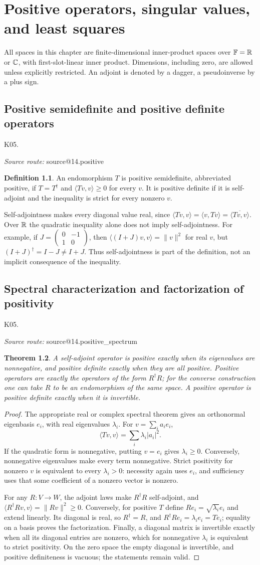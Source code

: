 \documentclass[11pt,a4paper]{book}
\makeatletter
\newtheorem{theorem}{Theorem}[chapter]
\theoremstyle{definition}\newtheorem{definition}[theorem]{Definition}
\theoremstyle{remark}\newtheorem{remark}[theorem]{Remark}
\newcommand{\ip}[2]{\langle #1,#2\rangle}
\newcommand{\norm}[1]{\lVert #1\rVert}
\newcommand{\Kentry}[2]{\section{#2}\label{k:#1}\noindent\textsf{\small K05.\detokenize{#1}}\par
  \begingroup\small\color{black!65}\textit{Source route: }\csname source@#1\endcsname\par\endgroup}
\makeatother
\begin{document}
\chapter{Positive operators, singular values, and least squares}
All spaces in this chapter are finite-dimensional inner-product spaces over $\mathbb F=\mathbb R$ or $\mathbb C$, with first-slot-linear inner product. Dimensions, including zero, are allowed unless explicitly restricted. An adjoint is denoted by a dagger, a pseudoinverse by a plus sign.

\Kentry{14.positive}{Positive semidefinite and positive definite operators}
\begin{definition}
An endomorphism $T$ is positive semidefinite, abbreviated positive, if $T=T^\dagger$ and $\ip{Tv}{v}\ge0$ for every $v$. It is positive definite if it is self-adjoint and the inequality is strict for every nonzero $v$.
\end{definition}
Self-adjointness makes every diagonal value real, since $\ip{Tv}{v}=\ip v{Tv}=\overline{\ip{Tv}{v}}$. Over $\mathbb R$ the quadratic inequality alone does not imply self-adjointness. For example, if $J=\begin{pmatrix}0&-1\\1&0\end{pmatrix}$, then $\ip{(I+J)v}{v}=\norm v^2$ for real $v$, but $(I+J)^\dagger=I-J\ne I+J$. Thus self-adjointness is part of the definition, not an implicit consequence of the inequality.

\Kentry{14.positive_spectrum}{Spectral characterization and factorization of positivity}
\begin{theorem}
A self-adjoint operator is positive exactly when its eigenvalues are nonnegative, and positive definite exactly when they are all positive. Positive operators are exactly the operators of the form $R^\dagger R$; for the converse construction one can take $R$ to be an endomorphism of the same space. A positive operator is positive definite exactly when it is invertible.
\end{theorem}
\begin{proof}
The appropriate real or complex spectral theorem gives an orthonormal eigenbasis $e_i$, with real eigenvalues $\lambda_i$. For $v=\sum_i a_i e_i$,
\[
\ip{Tv}{v}=\sum_i\lambda_i|a_i|^2.
\]
If the quadratic form is nonnegative, putting $v=e_i$ gives $\lambda_i\ge0$. Conversely, nonnegative eigenvalues make every term nonnegative. Strict positivity for nonzero $v$ is equivalent to every $\lambda_i>0$: necessity again uses $e_i$, and sufficiency uses that some coefficient of a nonzero vector is nonzero.

For any $R:V\to W$, the adjoint laws make $R^\dagger R$ self-adjoint, and
$\ip{R^\dagger Rv}{v}=\norm{Rv}^2\ge0$.
Conversely, for positive $T$ define $Re_i=\sqrt{\lambda_i}e_i$ and extend linearly. Its diagonal is real, so $R^\dagger=R$, and $R^\dagger Re_i=\lambda_i e_i=Te_i$; equality on a basis proves the factorization. Finally, a diagonal matrix is invertible exactly when all its diagonal entries are nonzero, which for nonnegative $\lambda_i$ is equivalent to strict positivity. On the zero space the empty diagonal is invertible, and positive definiteness is vacuous; the statements remain valid.
\end{proof}
\end{document}
